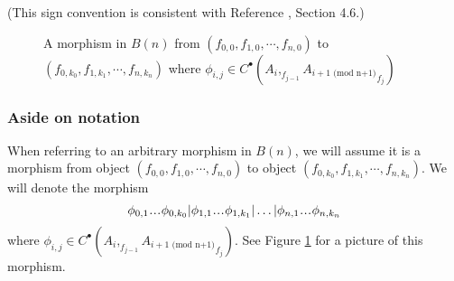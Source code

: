 (This sign convention is consistent with 
Reference \cite{T}, Section 4.6.)
%
\begin{figure}
\centerline{}
\caption{A morphism in $B(n)$
from $(f_{0,0}, f_{1,0}, \cdots, f_{n,0})$ to  
$(f_{0,k_0}, f_{1,k_1}, \cdots, f_{n,k_n})$ where
$\phi_{i,j} \in C^\bullet(A_i, _{f_{j-1}}{A_{i+1 \textrm{ (mod n+1)}}}_{f_j})$}
 \label{fig:phi}
\end{figure}
%
\subsubsection{Aside on notation} \label{sec:phi_notation}
When referring to an arbitrary morphism in $B(n)$,
we will assume it is a morphism from object $(f_{0,0}, f_{1,0}, \cdots, f_{n,0})$ 
to object $(f_{0,k_0}, f_{1,k_1}, \cdots, f_{n,k_n})$.
We will denote the morphism 
$$\phi_{0,1}\smdots\phi_{0,k_0} | 
\phi_{1,1}\smdots\phi_{1,k_1} | \dots |
\phi_{n,1}\smdots\phi_{n,k_n}$$ 
where $\phi_{i,j} \in C^\bullet(A_i, _{f_{j-1}}
{A_{i+1 \textrm{ (mod n+1)}}}_{f_j})$. 
See Figure \ref{fig:phi} for a picture of 
this morphism.
%
